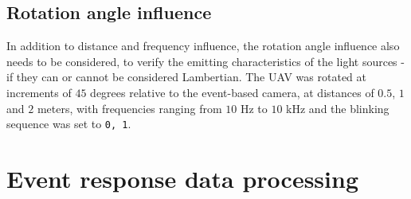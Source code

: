 \subsection{Rotation angle influence}

In addition to distance and frequency influence, the rotation angle influence also needs to be considered, to
verify the emitting characteristics of the light sources - if they can or cannot be considered Lambertian.
The \ac{UAV} was rotated at increments of $45$ degrees relative to the event-based camera, at distances of $0.5$, $1$ and $2$ meters,
with frequencies ranging from $10$ Hz to $10$ kHz and the blinking sequence was set to \texttt{0, 1}.




\section{Event response data processing}

